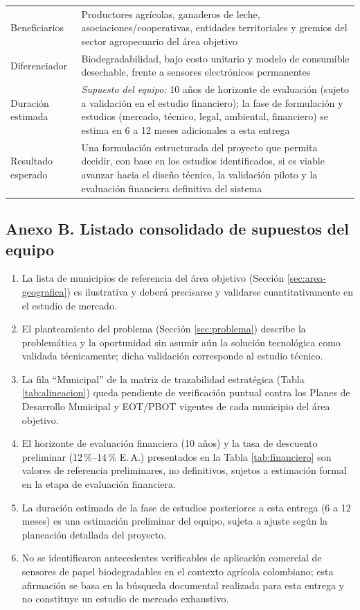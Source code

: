 \documentclass[11pt,a4paper]{article}
\newcommand{\supuesto}[1]{\textit{Supuesto del equipo: #1}}
\begin{document}
\begin{longtable}{L{3.6cm}L{10.4cm}}
Beneficiarios & Productores agrícolas, ganaderos de leche, asociaciones/cooperativas, entidades territoriales y gremios del sector agropecuario del área objetivo\\
Diferenciador & Biodegradabilidad, bajo costo unitario y modelo de consumible desechable, frente a sensores electrónicos permanentes\\
Duración estimada & \supuesto{} 10 años de horizonte de evaluación (sujeto a validación en el estudio financiero); la fase de formulación y estudios (mercado, técnico, legal, ambiental, financiero) se estima en 6 a 12 meses adicionales a esta entrega\\
Resultado esperado & Una formulación estructurada del proyecto que permita decidir, con base en los estudios identificados, si es viable avanzar hacia el diseño técnico, la validación piloto y la evaluación financiera definitiva del sistema\\
\bottomrule
\end{longtable}

\subsection*{Anexo B. Listado consolidado de supuestos del equipo}

\begin{enumerate}
\item La lista de municipios de referencia del área objetivo (Sección \ref{sec:area-geografica}) es ilustrativa y deberá precisarse y validarse cuantitativamente en el estudio de mercado.
\item El planteamiento del problema (Sección \ref{sec:problema}) describe la problemática y la oportunidad sin asumir aún la solución tecnológica como validada técnicamente; dicha validación corresponde al estudio técnico.
\item La fila ``Municipal'' de la matriz de trazabilidad estratégica (Tabla \ref{tab:alineacion}) queda pendiente de verificación puntual contra los Planes de Desarrollo Municipal y EOT/PBOT vigentes de cada municipio del área objetivo.
\item El horizonte de evaluación financiera (10 años) y la tasa de descuento preliminar (12\,\%--14\,\% E.\,A.) presentados en la Tabla \ref{tab:financiero} son valores de referencia preliminares, no definitivos, sujetos a estimación formal en la etapa de evaluación financiera.
\item La duración estimada de la fase de estudios posteriores a esta entrega (6 a 12 meses) es una estimación preliminar del equipo, sujeta a ajuste según la planeación detallada del proyecto.
\item No se identificaron antecedentes verificables de aplicación comercial de sensores de papel biodegradables en el contexto agrícola colombiano; esta afirmación se basa en la búsqueda documental realizada para esta entrega y no constituye un estudio de mercado exhaustivo.
\end{enumerate}
\end{document}
